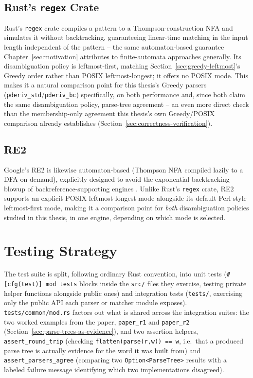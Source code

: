\subsection{Rust's \texttt{regex} Crate}
\label{sec:rust-regex-crate-eval}

Rust's \texttt{regex} crate compiles a pattern to a Thompson-construction
NFA and simulates it without backtracking, guaranteeing linear-time
matching in the input length independent of the pattern -- the same
automaton-based guarantee Chapter~\ref{sec:motivation} attributes to
finite-automata approaches generally. Its disambiguation policy is
leftmost-first, matching Section~\ref{sec:greedy-leftmost}'s Greedy
order rather than POSIX leftmost-longest; it offers no POSIX mode. This
makes it a natural comparison point for this thesis's Greedy parsers
(\texttt{pderiv\_std}/\texttt{pderiv\_bc}) specifically, on both
performance and, since both claim the same disambiguation policy,
parse-tree agreement -- an even more direct check than the
membership-only agreement this thesis's own Greedy/POSIX comparison
already establishes (Section~\ref{sec:correctness-verification}).

\subsection{RE2}
\label{sec:re2-eval}

Google's RE2 is likewise automaton-based (Thompson NFA compiled lazily
to a DFA on demand), explicitly designed to avoid the exponential
backtracking blowup of backreference-supporting engines
\citep{re2,cox2007}. Unlike Rust's \texttt{regex} crate, RE2 supports an
explicit POSIX leftmost-longest mode alongside its default Perl-style
leftmost-first mode, making it a comparison point for \emph{both}
disambiguation policies studied in this thesis, in one engine, depending
on which mode is selected.



\section{Testing Strategy}
\label{sec:testing-strategy}

The test suite is split, following ordinary Rust convention, into unit
tests (\texttt{\#[cfg(test)] mod tests} blocks inside the \texttt{src/}
files they exercise, testing private helper functions alongside public
ones) and integration tests (\texttt{tests/}, exercising only the public
API each parser or matcher module exposes). \texttt{tests/common/mod.rs}
factors out what is shared across the integration suites: the two
worked examples from the paper, \texttt{paper\_r1} and \texttt{paper\_r2}
(Section~\ref{sec:parse-trees-as-evidence}), and two assertion helpers,
\texttt{assert\_round\_trip} (checking \texttt{flatten(parse(r,w)) == w},
i.e.\ that a produced parse tree is actually evidence for the word it
was built from) and \texttt{assert\_parsers\_agree} (comparing two
\texttt{Option<ParseTree>} results with a labeled failure message
identifying which two implementations disagreed).

